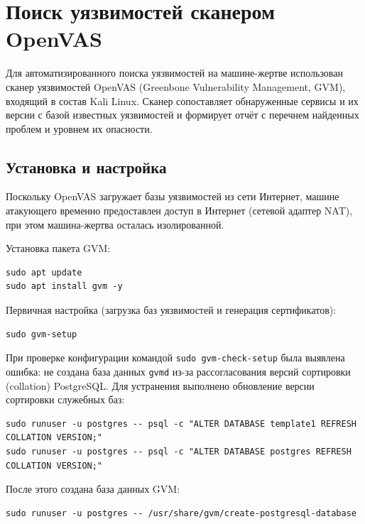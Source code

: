 \documentclass[a4paper,14pt]{extarticle}
\begin{document}
\section{Поиск уязвимостей сканером OpenVAS}

Для автоматизированного поиска уязвимостей на машине-жертве использован сканер уязвимостей OpenVAS (Greenbone Vulnerability Management, GVM), входящий в состав Kali Linux. Сканер сопоставляет обнаруженные сервисы и их версии с базой известных уязвимостей и формирует отчёт с перечнем найденных проблем и уровнем их опасности.

\subsection{Установка и настройка}

Поскольку OpenVAS загружает базы уязвимостей из сети Интернет, машине атакующего временно предоставлен доступ в Интернет (сетевой адаптер NAT), при этом машина-жертва осталась изолированной.

Установка пакета GVM:

\begin{lstlisting}
sudo apt update
sudo apt install gvm -y
\end{lstlisting}

Первичная настройка (загрузка баз уязвимостей и генерация сертификатов):

\begin{lstlisting}
sudo gvm-setup
\end{lstlisting}

При проверке конфигурации командой \texttt{sudo gvm-check-setup} была выявлена ошибка: не создана база данных \texttt{gvmd} из-за рассогласования версий сортировки (collation) PostgreSQL. Для устранения выполнено обновление версии сортировки служебных баз:

\begin{lstlisting}
sudo runuser -u postgres -- psql -c "ALTER DATABASE template1 REFRESH COLLATION VERSION;"
sudo runuser -u postgres -- psql -c "ALTER DATABASE postgres REFRESH COLLATION VERSION;"
\end{lstlisting}

После этого создана база данных GVM:

\begin{lstlisting}
sudo runuser -u postgres -- /usr/share/gvm/create-postgresql-database
\end{lstlisting}
\end{document}
